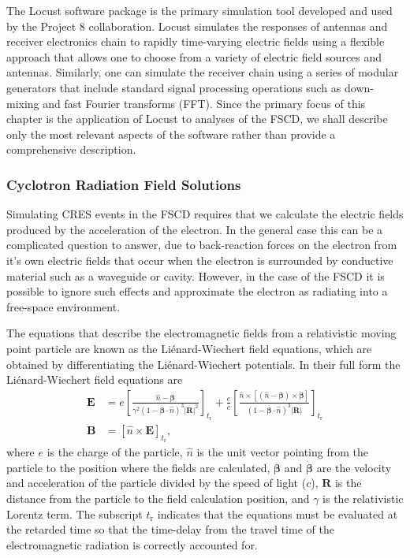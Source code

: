 The Locust software package is the primary simulation tool developed and used by the Project 8 collaboration. Locust simulates the responses of antennas and receiver electronics chain to rapidly time-varying electric fields using a flexible approach that allows one to choose from a variety of electric field sources and antennas. Similarly, one can simulate the receiver chain using a series of modular generators that include standard signal processing operations such as down-mixing and fast Fourier transforms (FFT). Since the primary focus of this chapter is the application of Locust to analyses of the FSCD, we shall describe only the most relevant aspects of the software rather than provide a comprehensive description.

\subsubsection*{Cyclotron Radiation Field Solutions}

Simulating CRES events in the FSCD requires that we calculate the electric fields produced by the acceleration of the electron. In the general case this can be a complicated question to answer, due to back-reaction forces on the electron from it's own electric fields that occur when the electron is surrounded by conductive material such as a waveguide or cavity. However, in the case of the FSCD it is possible to ignore such effects and approximate the electron as radiating into a free-space environment. 

The equations that describe the electromagnetic fields from a relativistic moving point particle are known as the Li\'{e}nard-Wiechert field equations, which are obtained by differentiating the Li\'{e}nard-Wiechert potentials. In their full form the Li\'{e}nard-Wiechert field equations are
\begin{align}
    \bm{E} &=e\left[\frac{\hat{n}-\bm{\beta}}{\gamma^2(1-\bm{\beta}\cdot\hat{n})^3|\bm{R}|^2}\right]_{t_\textrm{r}}
      +\frac{e}{c}\left[\frac{\hat{n}\times[(\hat{n}-\bm{\beta})\times\dot{\bm{\beta}}]}{(1-\bm{\beta}\cdot\hat{n})^3|\bm{R}|}\right]_{t_\textrm{r}}\label{eq:chap4-lw-eqn-efield}\\
    \bm{B} &= \left[\hat{n}\times \bm{E}\right]_{t_\textrm{r}},
\end{align}
where $e$ is the charge of the particle, $\hat{n}$ is the unit vector pointing from the particle to the position where the fields are calculated, $\bm{\beta}$ and $\dot{\bm{\beta}}$ are the velocity and acceleration of the particle divided by the speed of light ($c$), $\bm{R}$ is the distance from the particle to the field calculation position, and $\gamma$ is the relativistic Lorentz term. The subscript $t_\mathrm{r}$ indicates that the equations must be evaluated at the retarded time so that the time-delay from the travel time of the electromagnetic radiation is correctly accounted for. 


